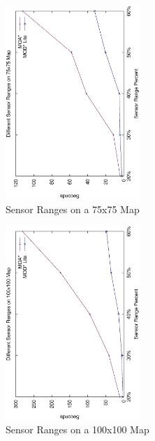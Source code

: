 \documentclass[10pt, a4paper, conference, compsocconf]{IEEEtran}
\begin{document}

\begin{figure}
\centering
\includegraphics[width=2.0in, angle=270]{75x75SensorRange}
\caption{Sensor Ranges on a 75x75 Map}
\label{fig:sensorRanges1}
\end{figure}

\begin{figure}
\centering
\includegraphics[width=2.0in, angle=270]{100x100SensorRange}
\caption{Sensor Ranges on a 100x100 Map}
\label{fig:sensorRanges2}
\end{figure}
\end{document}
